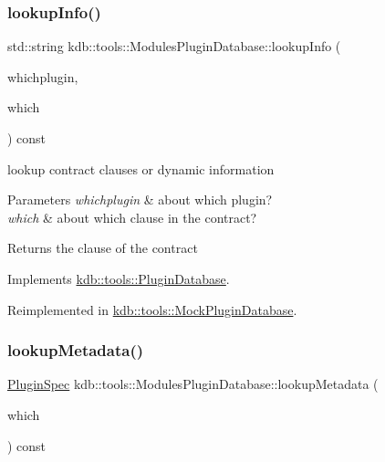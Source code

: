 \subsubsection{\texorpdfstring{lookupInfo()}{lookupInfo()}}
{\footnotesize\ttfamily std\+::string kdb\+::tools\+::\+Modules\+Plugin\+Database\+::lookup\+Info (\begin{DoxyParamCaption}\item[{\mbox{\hyperlink{classkdb_1_1tools_1_1PluginSpec}{Plugin\+Spec}} const \&}]{whichplugin,  }\item[{std\+::string const \&}]{which }\end{DoxyParamCaption}) const\hspace{0.3cm}{\ttfamily [virtual]}}



lookup contract clauses or dynamic information 


\begin{DoxyParams}{Parameters}
{\em whichplugin} & about which plugin? \\
\hline
{\em which} & about which clause in the contract?\\
\hline
\end{DoxyParams}
\begin{DoxyReturn}{Returns}
the clause of the contract 
\end{DoxyReturn}


Implements \mbox{\hyperlink{classkdb_1_1tools_1_1PluginDatabase_ac0af2ec31a98f4176c19eaf34977abbe}{kdb\+::tools\+::\+Plugin\+Database}}.



Reimplemented in \mbox{\hyperlink{classkdb_1_1tools_1_1MockPluginDatabase_ae352c27aa51bc8c2ea8c708d14f6fc76}{kdb\+::tools\+::\+Mock\+Plugin\+Database}}.

\mbox{\label{classkdb_1_1tools_1_1ModulesPluginDatabase_aa7f244f0271ea9b2a3f5b52779167f55}} 
\subsubsection{\texorpdfstring{lookupMetadata()}{lookupMetadata()}}
{\footnotesize\ttfamily \mbox{\hyperlink{classkdb_1_1tools_1_1PluginSpec}{Plugin\+Spec}} kdb\+::tools\+::\+Modules\+Plugin\+Database\+::lookup\+Metadata (\begin{DoxyParamCaption}\item[{std\+::string const \&}]{which }\end{DoxyParamCaption}) const\hspace{0.3cm}{\ttfamily [virtual]}}



